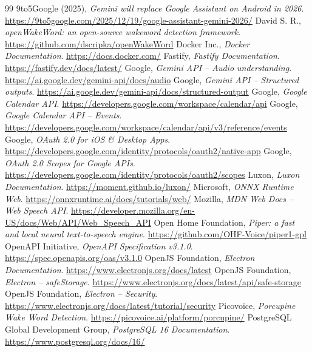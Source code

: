\begin{thebibliography}{99}
 9to5Google (2025), \textit{Gemini will replace Google Assistant on Android in 2026}. \url{https://9to5google.com/2025/12/19/google-assistant-gemini-2026/}
 David S. R., \textit{openWakeWord: an open-source wakeword detection framework}. \url{https://github.com/dscripka/openWakeWord}
 Docker Inc., \textit{Docker Documentation}. \url{https://docs.docker.com/}
 Fastify, \textit{Fastify Documentation}. \url{https://fastify.dev/docs/latest/}
 Google, \textit{Gemini API – Audio understanding}. \url{https://ai.google.dev/gemini-api/docs/audio}
 Google, \textit{Gemini API – Structured outputs}. \url{https://ai.google.dev/gemini-api/docs/structured-output}
 Google, \textit{Google Calendar API}. \url{https://developers.google.com/workspace/calendar/api}
 Google, \textit{Google Calendar API – Events}. \url{https://developers.google.com/workspace/calendar/api/v3/reference/events}
 Google, \textit{OAuth 2.0 for iOS \& Desktop Apps}. \url{https://developers.google.com/identity/protocols/oauth2/native-app}
 Google, \textit{OAuth 2.0 Scopes for Google APIs}. \url{https://developers.google.com/identity/protocols/oauth2/scopes}
 Luxon, \textit{Luxon Documentation}. \url{https://moment.github.io/luxon/}
 Microsoft, \textit{ONNX Runtime Web}. \url{https://onnxruntime.ai/docs/tutorials/web/}
 Mozilla, \textit{MDN Web Docs – Web Speech API}. \url{https://developer.mozilla.org/en-US/docs/Web/API/Web_Speech_API}
 Open Home Foundation, \textit{Piper: a fast and local neural text-to-speech engine}. \url{https://github.com/OHF-Voice/piper1-gpl}
 OpenAPI Initiative, \textit{OpenAPI Specification v3.1.0}. \url{https://spec.openapis.org/oas/v3.1.0}
 OpenJS Foundation, \textit{Electron Documentation}. \url{https://www.electronjs.org/docs/latest}
 OpenJS Foundation, \textit{Electron – safeStorage}. \url{https://www.electronjs.org/docs/latest/api/safe-storage}
 OpenJS Foundation, \textit{Electron – Security}. \url{https://www.electronjs.org/docs/latest/tutorial/security}
 Picovoice, \textit{Porcupine Wake Word Detection}. \url{https://picovoice.ai/platform/porcupine/}
 PostgreSQL Global Development Group, \textit{PostgreSQL 16 Documentation}. \url{https://www.postgresql.org/docs/16/}

\end{thebibliography}

